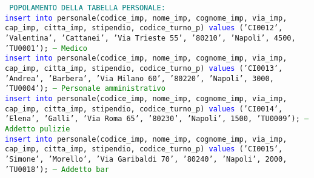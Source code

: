\documentclass{article}
\begin{document}
    \begin{flushleft}
        \texttt{
        \textcolor{teal}{POPOLAMENTO DELLA TABELLA PERSONALE:} \\
        \hspace*{0.5em}\textcolor{blue}{insert into} personale(codice\_imp, nome\_imp, cognome\_imp, via\_imp, cap\_imp, \hspace*{0.5em}citta\_imp, stipendio, codice\_turno\_p) \textcolor{blue}{values} ('CI0012', 'Valentina', 'Cattanei', \hspace*{0.5em}'Via Trieste \hspace*{0.5em}55', '80210', 'Napoli', 4500, 'TU0001'); \hspace*{0.5em} \textcolor{green}{-- Medico} \\
        \vspace{2mm}
        \hspace*{0.5em}\textcolor{blue}{insert into} personale(codice\_imp, nome\_imp, cognome\_imp, via\_imp, cap\_imp, \hspace*{0.5em}citta\_imp, stipendio, codice\_turno\_p) \textcolor{blue}{values} ('CI0013', 'Andrea', 'Barbera', 'Via \hspace*{0.5em}Milano 60', \hspace*{0.5em}'80220', 'Napoli', 3000, 'TU0004'); \hspace*{0.5em} \textcolor{green}{-- Personale amministrativo} \\
        \vspace{2mm}
        \hspace*{0.5em}\textcolor{blue}{insert into} personale(codice\_imp, nome\_imp, cognome\_imp, via\_imp, cap\_imp, \hspace*{0.5em}citta\_imp, stipendio, codice\_turno\_p) \textcolor{blue}{values} ('CI0014', 'Elena', 'Galli', 'Via \hspace*{0.5em}Roma 65', \hspace*{0.5em}'80230', 'Napoli', 1500, 'TU0009'); \hspace*{0.5em} \textcolor{green}{-- Addetto pulizie} \\
        \vspace{2mm}
        \hspace*{0.5em}\textcolor{blue}{insert into} personale(codice\_imp, nome\_imp, cognome\_imp, via\_imp, cap\_imp, \hspace*{0.5em}citta\_imp, stipendio, codice\_turno\_p) \textcolor{blue}{values} ('CI0015', 'Simone', 'Morello', 'Via \hspace*{0.5em}Garibaldi 70', \hspace*{0.5em}'80240', 'Napoli', 2000, 'TU0018'); \hspace*{0.5em} \textcolor{green}{-- Addetto bar} \\
}
\end{flushleft}
\end{document}
